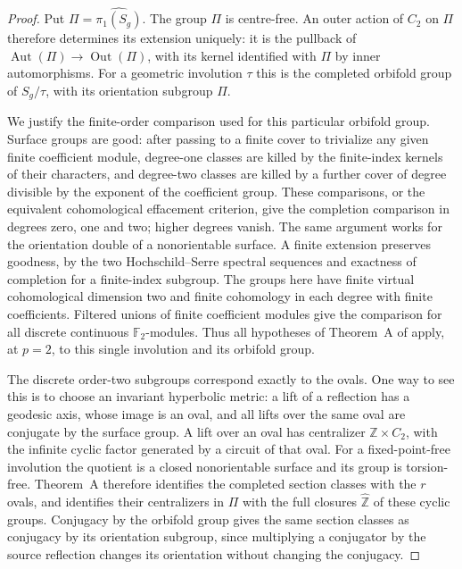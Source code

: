 \begin{proof}
Put $\Pi=\widehat{\pi_1(S_g)}$.  The group $\Pi$ is centre-free.
An outer action of $C_2$ on $\Pi$ therefore determines its extension
uniquely: it is the pullback of
$\operatorname{Aut}(\Pi)\to\operatorname{Out}(\Pi)$, with its
kernel identified with $\Pi$ by inner automorphisms.  For a
geometric involution $\tau$ this is the completed orbifold group
of $S_g/\tau$, with its orientation subgroup $\Pi$.

We justify the finite-order comparison used for this particular
orbifold group.  Surface groups are good: after passing to a
finite cover to trivialize any given finite coefficient module,
degree-one classes are killed by the finite-index kernels of
their characters, and degree-two classes are killed by a further
cover of degree divisible by the exponent of the coefficient
group.  These comparisons, or the equivalent cohomological
effacement criterion, give the completion comparison in degrees
zero, one and two; higher degrees vanish.  The same argument
works for the orientation double of a nonorientable surface.
A finite extension preserves goodness, by the two
Hochschild--Serre spectral sequences and exactness of completion
for a finite-index subgroup.  The groups here have finite virtual
cohomological dimension two and finite cohomology in each degree
with finite coefficients.  Filtered unions of finite coefficient
modules give the comparison for all discrete continuous
$\mathbb F_2$-modules.  Thus all hypotheses of Theorem~A of
\cite{CEBoggiZalesskii2025} apply, at $p=2$, to this single
involution and its orbifold group.

The discrete order-two subgroups correspond exactly to the
ovals.  One way to see this is to choose an invariant hyperbolic
metric: a lift of a reflection has a geodesic axis, whose image
is an oval, and all lifts over the same oval are conjugate by
the surface group.  A lift over an oval has centralizer
$\mathbb Z\times C_2$, with the infinite cyclic factor generated
by a circuit of that oval.  For a fixed-point-free involution
the quotient is a closed nonorientable surface and its group
is torsion-free.  Theorem~A therefore identifies the completed
section classes with the $r$ ovals, and identifies their
centralizers in $\Pi$ with the full closures
$\widehat{\mathbb Z}$ of these cyclic groups.  Conjugacy by the
orbifold group gives the same section classes as conjugacy by
its orientation subgroup, since multiplying a conjugator by
the source reflection changes its orientation without changing
the conjugacy.


\end{proof}
